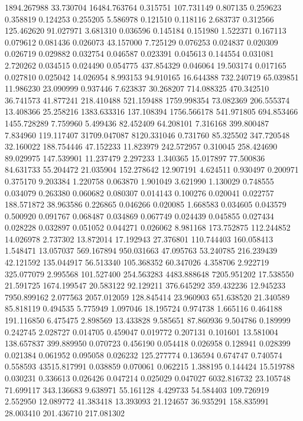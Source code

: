 1894.267988
33.730704
16484.763764
0.315751
107.731149
0.807135
0.259623
0.358819
0.124253
0.255205
5.586978
0.121510
0.118116
2.683737
0.312566
125.462620
91.027971
3.681310
0.036596
0.145184
0.151980
1.522371
0.167113
0.079612
0.081436
0.026073
43.157000
7.725129
0.076253
0.024837
0.020309
0.026719
0.029882
0.032754
0.046587
0.023391
0.045613
0.144554
0.031081
2.720262
0.034515
0.024490
0.054775
437.854329
0.046064
19.503174
0.017165
0.027810
0.025042
14.026954
8.993153
94.910165
16.644388
732.240719
65.039851
11.986230
23.090999
0.937446
7.623837
30.268207
714.088325
470.342510
36.741573
41.877241
218.410488
521.159488
1759.998354
73.082369
206.555374
13.408366
25.258216
1383.633316
137.108394
1756.566178
541.971805
694.853466
1455.728289
7.759960
5.499436
82.452409
64.208101
7.316168
399.800487
7.834960
119.117407
31709.047087
8120.331046
0.731760
85.325502
347.720548
32.160022
188.754446
47.152233
11.823979
242.572957
0.310045
258.424690
89.029975
147.539901
11.237479
2.297233
1.340365
15.017897
77.500836
84.631733
55.204472
21.035904
152.278642
12.907191
4.624511
0.930497
0.200971
0.375170
9.203384
1.220758
0.063870
1.901049
3.621990
1.130029
0.748555
0.034079
0.263380
0.060682
0.080307
0.014143
0.100276
0.020041
0.022757
188.571872
38.963586
0.226865
0.046266
0.020085
1.668583
0.034605
0.043579
0.500920
0.091767
0.068487
0.034869
0.067749
0.024439
0.045855
0.027434
0.028228
0.032897
0.051052
0.044271
0.026062
8.981168
173.752875
112.244852
14.026978
2.737302
13.872014
17.192943
27.376801
110.744403
160.058413
1.548471
13.057037
569.167894
950.031663
47.095763
53.240785
216.239439
42.121592
135.044917
56.513340
105.368352
60.347026
4.358706
2.922719
325.077079
2.995568
101.527400
254.563283
4483.888648
7205.951202
17.538550
21.591725
1674.199547
20.583122
92.129211
376.645292
359.432236
12.945233
7950.899162
2.077563
2057.012059
128.845414
23.960903
651.638520
21.340589
85.818119
0.494535
5.775949
1.097046
18.195724
0.974738
1.665116
0.464188
191.116850
6.475475
2.898569
13.433828
9.585651
87.860936
9.504786
0.189999
0.242745
2.028727
0.014705
0.459047
0.019772
0.207131
0.101601
13.581004
138.657837
399.889950
0.070723
0.456190
0.054418
0.026958
0.128941
0.028399
0.021384
0.061952
0.095058
0.026232
125.277774
0.136594
0.674747
0.740574
0.558593
43515.817991
0.038859
0.070061
0.062215
1.388195
0.144424
15.519788
0.030231
0.336613
0.026426
0.047214
0.025029
0.047027
6032.816732
23.105748
71.699117
343.136683
9.638971
55.161128
4.429733
54.584403
109.726919
2.552950
12.089772
41.383418
13.393093
21.124657
36.935291
158.835991
28.003410
201.436710
217.081302
